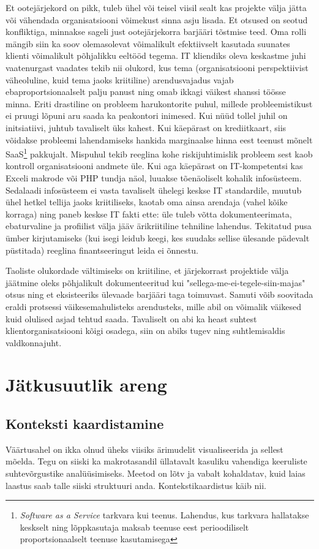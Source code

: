 \documentclass{article}
\begin{document}
Et ootejärjekord on pikk, tuleb ühel või teisel viisil sealt kas projekte välja jätta või vähendada organisatsiooni võimekust sinna asju lisada. Et otsused on seotud konfliktiga, minnakse sageli just ootejärjekorra barjääri tõstmise teed. Oma rolli mängib siin ka soov olemasolevat võimalikult efektiivselt kasutada suunates klienti võimalikult põhjalikku eeltööd tegema. IT kliendiks oleva keskastme juhi vaatenurgast vaadates tekib nii olukord, kus tema (organisatsiooni perspektiivist väheoluline, kuid tema jaoks kriitiline) arendusvajadus vajab ebaproportsionaalselt palju panust ning omab ikkagi väikest shanssi töösse minna. Eriti drastiline on probleem harukontorite puhul, millede probleemistikust ei pruugi lõpuni aru saada ka peakontori inimesed. Kui nüüd tollel juhil on initsiatiivi, juhtub tavaliselt üks kahest. Kui käepärast on krediitkaart, siis võidakse probleemi lahendamiseks hankida marginaalse hinna eest teenust mõnelt SaaS\footnote{\emph{Software as a Service} tarkvara kui teenus. Lahendus, kus tarkvara hallatakse keskselt ning lõppkasutaja maksab teenuse eest perioodiliselt proportsionaalselt teenuse kasutamisega} pakkujalt. Mispuhul tekib reeglina kohe riskijuhtimislik probleem sest kaob kontroll organisatsiooni andmete üle. Kui aga käepärast on IT-kompetentsi kas Exceli makrode või PHP tundja näol, luuakse tõenäoliselt kohalik infosüsteem. Sedalaadi infosüsteem ei vasta tavaliselt ühelegi keskse IT standardile, muutub ühel hetkel tellija jaoks kriitiliseks, kaotab oma ainsa arendaja (vahel kõike korraga) ning paneb keskse IT fakti ette: üle tuleb võtta dokumenteerimata, ebaturvaline ja profiilist välja jääv ärikriitiline tehniline lahendus. Tekitatud pusa ümber kirjutamiseks (kui isegi leidub keegi, kes suudaks sellise ülesande pädevalt püstitada) reeglina finantseeringut leida ei õnnestu. 

Taoliste olukordade vältimiseks on kriitiline, et järjekorrast projektide välja jäätmine oleks põhjalikult dokumenteeritud kui "sellega-me-ei-tegele-siin-majas" otsus ning et eksisteeriks ülevaade barjääri taga toimuvast. Samuti võib soovitada eraldi protsessi väikesemahulisteks arendusteks, mille abil on võimalik väikesed kuid olulised asjad tehtud saada. Tavaliselt on abi ka heast suhtest klientorganisatsiooni kõigi osadega, siin on abiks tugev ning suhtlemisaldis valdkonnajuht.

\section{Jätkusuutlik areng}
\subsection{Konteksti kaardistamine}
Väärtusahel on ikka olnud üheks viisiks ärimudelit visualiseerida ja sellest mõelda. Tegu on siiski ka makrotasandil üllatavalt kasuliku vahendiga keeruliste suhtevõrgustike analüüsimiseks. Meetod on lõtv ja vabalt kohaldatav, kuid laias laastus saab talle siiski struktuuri anda. Kontekstikaardistus käib nii. 
\end{document}
